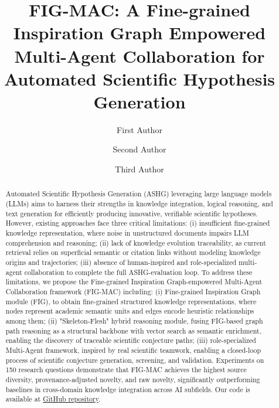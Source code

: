 \documentclass[runningheads]{llncs}
\begin{document}
\title{FIG-MAC: A Fine-grained Inspiration Graph Empowered Multi-Agent Collaboration for Automated Scientific Hypothesis Generation}


\author{First Author \and Second Author \and Third Author}



\maketitle

\begin{abstract}
Automated Scientific Hypothesis Generation (ASHG) leveraging large language models (LLMs) aims to harness their strengths in knowledge integration, logical reasoning, and text generation for efficiently producing innovative, verifiable scientific hypotheses. However, existing approaches face three critical limitations: (i) insufficient fine-grained knowledge representation, where noise in unstructured documents impairs LLM comprehension and reasoning; (ii) lack of knowledge evolution traceability, as current retrieval relies on superficial semantic or citation links without modeling knowledge origins and trajectories; (iii) absence of human-inspired and role-specialized multi-agent collaboration to complete the full ASHG-evaluation loop. To address these limitations, we propose the Fine-grained Inspiration Graph-empowered Multi-Agent Collaboration framework (FIG-MAC) including: (i) Fine-grained Inspiration Graph module (FIG), to obtain fine-grained structured knowledge representations, where nodes represent academic semantic units and edges encode heuristic relationships among them; (ii) "Skeleton-Flesh" hybrid reasoning module, fusing FIG-based graph path reasoning as a structural backbone with vector search as semantic enrichment, enabling the discovery of traceable scientific conjecture paths; (iii) role-specialized Multi-Agent framework, inspired by real scientific teamwork, enabling a closed-loop process of scientific conjecture generation, screening, and validation. Experiments on 150 research questions demonstrate that FIG-MAC achieves the highest source diversity, provenance-adjusted novelty, and raw novelty, significantly outperforming baselines in cross-domain knowledge integration across AI subfields. Our code is available at \href{https://github.com/SiyuanChenToDo/KG-LLM.git}{GitHub repository}.

\end{abstract}
\end{document}

